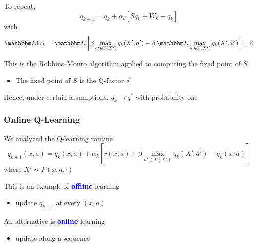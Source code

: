 \documentclass[xcolor=dvipsnames]{beamer}  %
\newcommand{\navy}[1]{\textcolor{blue}{\bf #1}}
\newcommand{\1}{\mathbbm 1}
\newcommand{\EE}{\mathbbm E}
\begin{document}
\begin{frame}
    
    To repeat,
    \begin{equation*}
        q_{k+1} 
        = q_k + \alpha_k 
        \left[
            S q_k + W_k - q_k
        \right]
    \end{equation*}
    with
    \begin{equation*}
        \EE W_k 
        = \EE 
        \left[ 
            \beta \max_{a' \in \Gamma(X')} q_k(X', a') 
            - \beta \, \EE \max_{a' \in \Gamma(X')} q_k(X', a')
        \right] = 0
    \end{equation*}

    This is the Robbins--Monro algorithm applied to computing the fixed point
    of $S$

    \begin{itemize}
        \item The fixed point of $S$ is the Q-factor $q^*$
    \end{itemize}
            \vspace{0.5em}
            \vspace{0.5em}

    Hence, under certain assumptions, $q_k \to q^*$ with probability one

\end{frame}

\begin{frame}
    \frametitle{Online Q-Learning} 

    We analyzed the Q-learning routine
    \begin{equation*}
        q_{k+1}(x,a) 
        = q_k(x,a) + \alpha_k 
        \left[
            r(x,a) + \beta \max_{a' \in \Gamma(X')} q_k(X', a')
            - q_k(x,a)
        \right]
    \end{equation*}
    where $X' \sim P(x, a, \cdot)$

    This is an example of \navy{offline} learning

    \begin{itemize}
        \item update $q_{k+1}$ at every $(x,a)$
    \end{itemize}

    An alternative is \navy{online} learning

    \begin{itemize}
        \item update along a sequence
    \end{itemize}

\end{frame}
\end{document}
